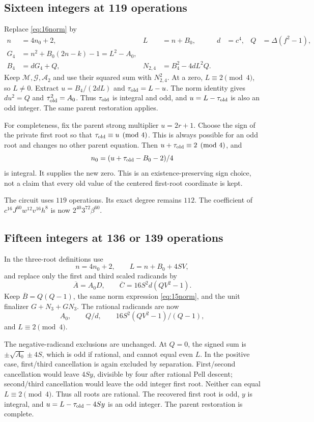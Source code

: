 \documentclass[11pt,letterpaper]{article}
\theoremstyle{remark}\newtheorem{remark}[theorem]{Remark}
\begin{document}
\subsection{Sixteen integers at 119 operations}
Replace \eqref{eq:16norm} by
\begin{align*}
 n&=4n_0+2,&L&=n+B_0,&d&=c^4,&Q&=\Delta(f^2-1),\\
 G_4&=n^2+B_0(2n-k)-1=L^2-A_0,\\
 B_4&=dG_4+Q,&N_{2,4}&=B_4^2-4dL^2Q.
\end{align*}
Keep $\mathcal M,\mathcal G,\mathcal A_2$ and use their squared sum
with $N_{2,4}^2$. At a zero, $L\equiv2\pmod4$, so $L\ne0$.
Extract $u=B_4/(2dL)$ and $\tau_{\rm old}=L-u$.
The norm identity gives $du^2=Q$ and $\tau_{\rm old}^2=A_0$.
Thus $\tau_{\rm old}$ is integral and odd, and $u=L-\tau_{\rm old}$
is also an odd integer. The same parent restoration applies.

For completeness, fix the parent strong multiplier $u=2r+1$.
Choose the sign of the private first root so that
$\tau_{\rm old}\equiv u\pmod4$. This is always possible for an odd root
and changes no other parent equation. Then
$u+\tau_{\rm old}\equiv2\pmod4$, and
\[
 n_0=(u+\tau_{\rm old}-B_0-2)/4
\]
is integral. It supplies the new zero. This is an existence-preserving
sign choice, not a claim that every old value of the centered first-root
coordinate is kept.

The circuit uses $119$ operations. Its exact degree remains $112$.
The coefficient of $c^{16}J^{60}w^{12}v^{16}h^8$ is now
$2^{40}3^{72}\beta^{60}$.

\subsection{Fifteen integers at 136 or 139 operations}
In the three-root definitions use
\[
 n=4n_0+2,\qquad L=n+B_0+4SV,
\]
and replace only the first and third scaled radicands by
\[
 \overline A=A_0D,\qquad
 \overline C=16S^2d(QV^2-1).
\]
Keep $\overline B=Q(Q-1)$, the same norm expression
\eqref{eq:15norm}, and the unit finalizer $G+N_3+GN_3$.
The rational radicands are now
\[
 A_0,\qquad Q/d,\qquad
 16S^2(QV^2-1)/(Q-1),
\]
and $L\equiv2\pmod4$.

The negative-radicand exclusions are unchanged. At $Q=0$, the signed
sum is $\pm\sqrt{A_0}\pm4S$, which is odd if rational, and cannot equal
even $L$. In the positive case, first/third cancellation is again excluded
by separation. First/second cancellation would leave $4Sy$, divisible by
four after rational Pell descent; second/third cancellation would leave
the odd integer first root. Neither can equal $L\equiv2\pmod4$.
Thus all roots are rational. The recovered first root is odd,
$y$ is integral, and
$u=L-\tau_{\rm old}-4Sy$ is an odd integer.
The parent restoration is complete.
\end{document}
